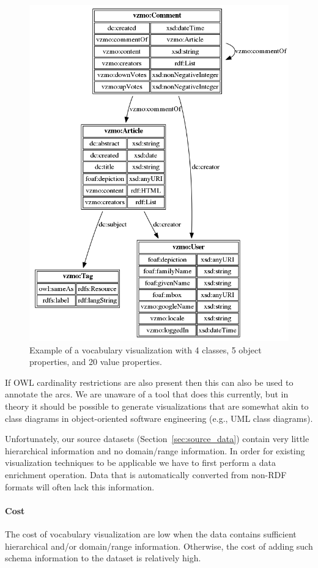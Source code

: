 \documentclass[a4paper]{scrartcl}
\begin{document}
\begin{figure}
  \centering
  \includegraphics[width=0.75\linewidth]{img/vocab_viz}
  \caption{Example of a vocabulary visualization with 4 classes, 5
    object properties, and 20 value properties.}
  \label{fig:vocab_viz}
\end{figure}

If OWL cardinality restrictions are also present then this can also be
used to annotate the arcs.  We are unaware of a tool that does this
currently, but in theory it should be possible to generate
visualizations that are somewhat akin to class diagrams in
object-oriented software engineering (e.g., UML class diagrams).

Unfortunately, our source datasets (Section~\ref{sec:source_data})
contain very little hierarchical information and no domain/range
information.  In order for existing visualization techniques to be
applicable we have to first perform a data enrichment operation.  Data
that is automatically converted from non-RDF formats will often lack
this information.

\paragraph{Cost}
The cost of vocabulary visualization are low when the data contains
sufficient hierarchical and/or domain/range information.  Otherwise,
the cost of adding such schema information to the dataset is
relatively high.
\end{document}
